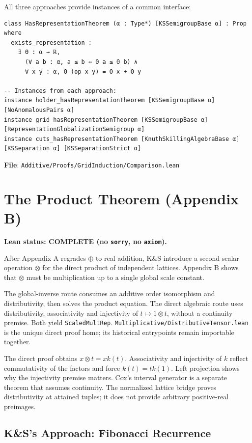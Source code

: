 \documentclass[11pt]{article}
\theoremstyle{definition}
\theoremstyle{remark}
\begin{document}
All three approaches provide instances of a common interface:

\begin{lstlisting}[caption={Unified representation theorem interface}]
class HasRepresentationTheorem (α : Type*) [KSSemigroupBase α] : Prop where
  exists_representation :
    ∃ Θ : α → ℝ,
      (∀ a b : α, a ≤ b ↔ Θ a ≤ Θ b) ∧
      ∀ x y : α, Θ (op x y) = Θ x + Θ y

-- Instances from each approach:
instance holder_hasRepresentationTheorem [KSSemigroupBase α] [NoAnomalousPairs α]
instance grid_hasRepresentationTheorem [KSSemigroupBase α] [RepresentationGlobalizationSemigroup α]
instance cuts_hasRepresentationTheorem [KnuthSkillingAlgebraBase α] [KSSeparation α] [KSSeparationStrict α]
\end{lstlisting}

\textbf{File}: \texttt{Additive/Proofs/GridInduction/Comparison.lean}

\section{The Product Theorem (Appendix B)}
\label{sec:product}

\textbf{Lean status: COMPLETE (no \texttt{sorry}, no \texttt{axiom}).}

After Appendix A regrades $\oplus$ to real addition, K\&S introduce a second scalar operation
$\otimes$ for the direct product of independent lattices.  Appendix B shows that $\otimes$ must
be multiplication up to a single global scale constant.

The global-inverse route consumes an additive order isomorphism and
distributivity, then solves the product equation. The direct algebraic route
uses distributivity, associativity and injectivity of $t\mapsto1\otimes t$,
without a continuity premise. Both yield \texttt{ScaledMultRep}.
\texttt{Multiplicative/DistributiveTensor.lean} is the unique direct proof home;
its historical entrypoints remain importable together.

The direct proof obtains $x\otimes t=xk(t)$. Associativity and injectivity of
$k$ reflect commutativity of the factors and force $k(t)=tk(1)$.
Left projection shows why the injectivity premise matters.
Cox's interval generator is a separate theorem that assumes continuity.
The normalized lattice bridge proves distributivity at attained tuples;
it does not provide arbitrary positive-real preimages.

\subsection{K\&S's Approach: Fibonacci Recurrence}
\end{document}
